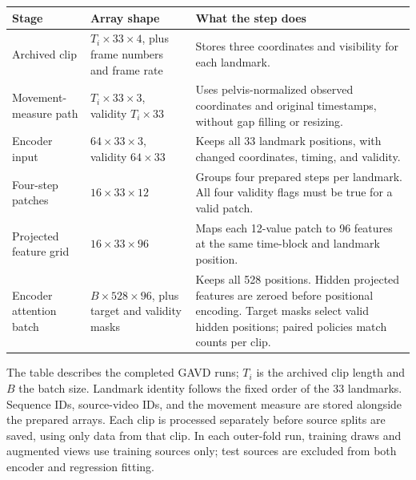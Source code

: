 \documentclass{article}
\begin{document}
\begin{table}[htbp]
\centering
\small
\begin{tabular}{@{}
  >{\raggedright\arraybackslash}p{}
  >{\raggedright\arraybackslash}p{}
  >{\raggedright\arraybackslash}p{}@{}}
\toprule\noalign{}
\begin{minipage}[b]{\linewidth}\raggedright
Stage
\end{minipage} & \begin{minipage}[b]{\linewidth}\raggedright
Array shape
\end{minipage} & \begin{minipage}[b]{\linewidth}\raggedright
What the step does
\end{minipage} \\
\midrule\noalign{}

Archived clip & \(T_i\times33\times4\), plus frame numbers and frame rate & Stores three coordinates and visibility for each landmark. \\
Movement-measure path & \(T_i\times33\times3\), validity \(T_i\times33\) & Uses pelvis-normalized observed coordinates and original timestamps, without gap filling or resizing. \\
Encoder input & \(64\times33\times3\), validity \(64\times33\) & Keeps all 33 landmark positions, with changed coordinates, timing, and validity. \\
Four-step patches & \(16\times33\times12\) & Groups four prepared steps per landmark. All four validity flags must be true for a valid patch. \\
Projected feature grid & \(16\times33\times96\) & Maps each 12-value patch to 96 features at the same time-block and landmark position. \\
Encoder attention batch & \(B\times528\times96\), plus target and validity masks & Keeps all 528 positions. Hidden projected features are zeroed before positional encoding. Target masks select valid hidden positions; paired policies match counts per clip. \\
\bottomrule
\end{tabular}
\end{table}

The table describes the completed GAVD runs; \(T_i\) is the archived clip length and \(B\) the batch size. Landmark identity follows the fixed order of the 33 landmarks. Sequence IDs, source-video IDs, and the movement measure are stored alongside the prepared arrays. Each clip is processed separately before source splits are saved, using only data from that clip. In each outer-fold run, training draws and augmented views use training sources only; test sources are excluded from both encoder and regression fitting.
\end{document}
